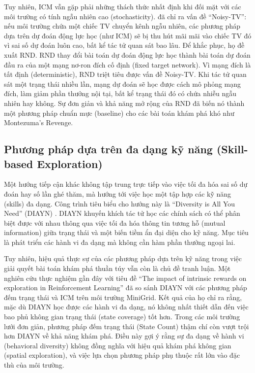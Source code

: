 \documentclass{uetgraduation}
\begin{document}
Tuy nhiên, ICM vẫn gặp phải những thách thức nhất định khi đối mặt với các môi trường có tính ngẫu nhiên cao (stochasticity). \cite{burda2019curiosity} đã chỉ ra vấn đề ``Noisy-TV'': nếu môi trường chứa một chiếc TV chuyển kênh ngẫu nhiên, các phương pháp dựa trên dự đoán động lực học (như ICM) sẽ bị thu hút mãi mãi vào chiếc TV đó vì sai số dự đoán luôn cao, bất kể tác tử quan sát bao lâu. Để khắc phục, họ đề xuất RND. RND thay đổi bài toán dự đoán động lực học thành bài toán dự đoán đầu ra của một mạng nơ-ron đích cố định (fixed target network). Vì mạng đích là tất định (deterministic), RND triệt tiêu được vấn đề Noisy-TV. Khi tác tử quan sát một trạng thái nhiều lần, mạng dự đoán sẽ học được cách mô phỏng mạng đích, làm giảm phần thưởng nội tại, bất kể trạng thái đó có chứa nhiễu ngẫu nhiên hay không. Sự đơn giản và khả năng mở rộng của RND đã biến nó thành một phương pháp chuẩn mực (baseline) cho các bài toán khám phá khó như Montezuma's Revenge.

\subsection{Phương pháp dựa trên đa dạng kỹ năng (Skill-based Exploration)}

Một hướng tiếp cận khác không tập trung trực tiếp vào việc tối đa hóa sai số dự đoán hay số lần ghé thăm, mà hướng tới việc học một tập hợp các kỹ năng (skills) đa dạng. Công trình tiêu biểu cho hướng này là ``Diversity is All You Need'' (DIAYN) \cite{eysenbach2019}. DIAYN khuyến khích tác tử học các chính sách có thể phân biệt được với nhau thông qua việc tối đa hóa thông tin tương hỗ (mutual information) giữa trạng thái và một biến tiềm ẩn đại diện cho kỹ năng. Mục tiêu là phát triển các hành vi đa dạng mà không cần hàm phần thưởng ngoại lai.

Tuy nhiên, hiệu quả thực sự của các phương pháp dựa trên kỹ năng trong việc giải quyết bài toán khám phá thuần túy vẫn còn là chủ đề tranh luận. Một nghiên cứu thực nghiệm gần đây \cite{kayal2025} với tiêu đề ``The impact of intrinsic rewards on exploration in Reinforcement Learning'' đã so sánh DIAYN với các phương pháp đếm trạng thái và ICM trên môi trường MiniGrid. Kết quả của họ chỉ ra rằng, mặc dù DIAYN học được các hành vi đa dạng, nó không nhất thiết dẫn đến việc bao phủ không gian trạng thái (state coverage) tốt hơn. Trong các môi trường lưới đơn giản, phương pháp đếm trạng thái (State Count) thậm chí còn vượt trội hơn DIAYN về khả năng khám phá. Điều này gợi ý rằng sự đa dạng về hành vi (behavioral diversity) không đồng nghĩa với hiệu quả khám phá không gian (spatial exploration), và việc lựa chọn phương pháp phụ thuộc rất lớn vào đặc thù của môi trường.
\end{document}
